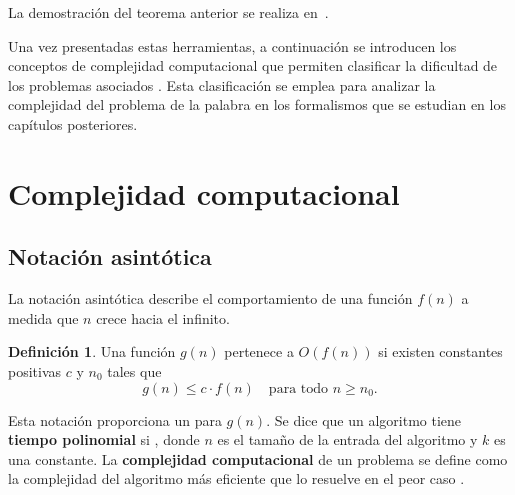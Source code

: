 \documentclass{report}
\theoremstyle{definition}
\newtheorem{definicion}{Definición}[chapter]
\theoremstyle{plain}
\theoremstyle{remark}
\begin{document}
La demostración del teorema anterior se realiza en~\cite{hopcroft2006introduction}.

Una vez presentadas estas herramientas, a continuación se introducen los conceptos de complejidad computacional que permiten clasificar la dificultad de los problemas asociados . Esta clasificación se emplea para analizar la complejidad del problema de la palabra en los formalismos que se estudian en los capítulos posteriores.

\section{Complejidad computacional}
\label{sec:complejidad}


\subsection{Notación asintótica}

La notación asintótica describe el comportamiento de una función $f(n)$ a medida que $n$ crece hacia el infinito.

\begin{definicion}
  Una función $g(n)$ pertenece a $O(f(n))$ si existen constantes positivas $c$ y $n_0$ tales que
\[
  g(n) \le c \cdot f(n) \quad \text{para todo } n \ge n_0.
\]
\end{definicion}

Esta notación proporciona un  para $g(n)$. Se dice que un algoritmo tiene \textbf{tiempo polinomial} si , donde $n$ es el tamaño de la entrada del algoritmo y $k$ es una constante. La \textbf{complejidad computacional} de un problema se define como la complejidad del algoritmo más eficiente que lo resuelve en el peor caso \agregaesto{[REF]}.
\end{document}
